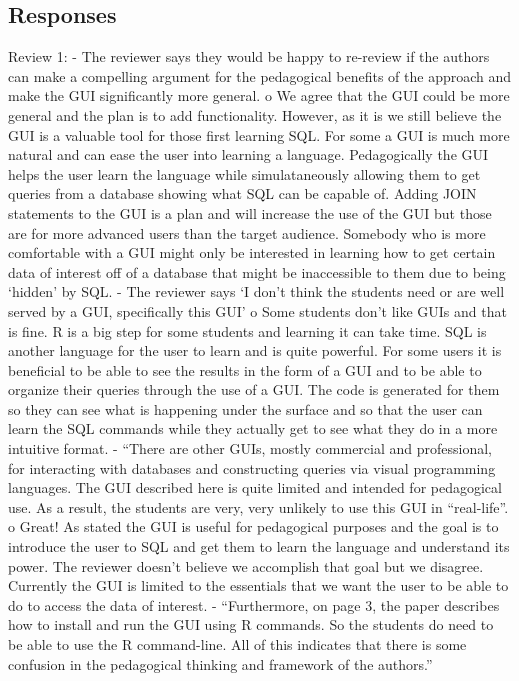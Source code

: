 \documentclass[11pt]{tise_style}
\begin{document}
\subsection{{Responses}}
Review 1:
-	The reviewer says they would be happy to re-review if the authors can make a compelling argument for the pedagogical benefits of the approach and make the GUI significantly more general.
o	We agree that the GUI could be more general and the plan is to add functionality.  However, as it is we still believe the GUI is a valuable tool for those first learning SQL.  For some a GUI is much more natural and can ease the user into learning a language.  Pedagogically the GUI helps the user learn the language while simulataneously allowing them to get queries from a database showing what SQL can be capable of.  Adding JOIN statements to the GUI is a plan and will increase the use of the GUI but those are for more advanced users than the target audience.  Somebody who is more comfortable with a GUI might only be interested in learning how to get certain data of interest off of a database that might be inaccessible to them due to being ‘hidden’ by SQL.
-	The reviewer says ‘I don’t think the students need or are well served by a GUI, specifically this GUI’
o	Some students don’t like GUIs and that is fine.  R is a big step for some students and learning it can take time.  SQL is another language for the user to learn and is quite powerful.  For some users it is beneficial to be able to see the results in the form of a GUI and to be able to organize their queries through the use of a GUI.  The code is generated for them so they can see what is happening under the surface and so that the user can learn the SQL commands while they actually get to see what they do in a more intuitive format.
-	“There are other GUIs, mostly commercial and professional, for interacting with databases and constructing queries via visual programming languages.  The GUI described here is quite limited and intended for pedagogical use. As a result, the students are very, very unlikely to use this GUI in “real-life”.
o	Great! As stated the GUI is useful for pedagogical purposes and the goal is to introduce the user to SQL and get them to learn the language and understand its power.  The reviewer doesn’t believe we accomplish that goal but we disagree.   Currently the GUI is limited to the essentials that we want the user to be able to do to access the data of interest.
-	“Furthermore, on page 3, the paper describes how to install and run the GUI using R commands. So the students do need to be able to use the R command-line. All of this indicates that there is some confusion in the pedagogical thinking and framework of the authors.”
\end{document}
